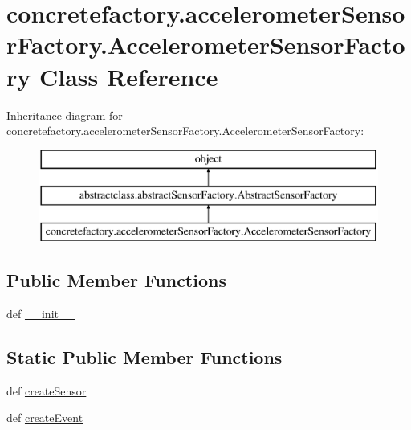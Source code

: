 \hypertarget{classconcretefactory_1_1accelerometerSensorFactory_1_1AccelerometerSensorFactory}{}\section{concretefactory.\+accelerometer\+Sensor\+Factory.\+Accelerometer\+Sensor\+Factory Class Reference}
\label{classconcretefactory_1_1accelerometerSensorFactory_1_1AccelerometerSensorFactory}
Inheritance diagram for concretefactory.\+accelerometer\+Sensor\+Factory.\+Accelerometer\+Sensor\+Factory\+:\begin{figure}[H]
\begin{center}
\leavevmode
\includegraphics[height=3.000000cm]{classconcretefactory_1_1accelerometerSensorFactory_1_1AccelerometerSensorFactory}
\end{center}
\end{figure}
\subsection*{Public Member Functions}
\begin{DoxyCompactItemize}
\item 
def \hyperlink{classconcretefactory_1_1accelerometerSensorFactory_1_1AccelerometerSensorFactory_a0c3cf1a120431554df25fff3773960dd}{\+\_\+\+\_\+init\+\_\+\+\_\+}
\end{DoxyCompactItemize}
\subsection*{Static Public Member Functions}
\begin{DoxyCompactItemize}
\item 
def \hyperlink{classconcretefactory_1_1accelerometerSensorFactory_1_1AccelerometerSensorFactory_acc779765811f2da3b7a212550936b63b}{create\+Sensor}
\item 
def \hyperlink{classconcretefactory_1_1accelerometerSensorFactory_1_1AccelerometerSensorFactory_a82fd21d568399e7023067c381f0c7f16}{create\+Event}
\end{DoxyCompactItemize}



